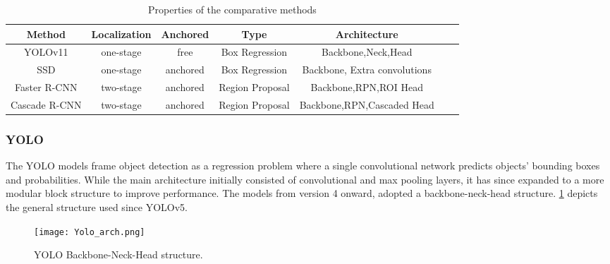 \documentclass{article}
\begin{document}
\begin{table}[!htb]
\begin{center}
\caption{Properties of the comparative methods}
\begin{tabular}{c|cccccc}
\hline
Method&Localization&Anchored&Type&Architecture \\
\hline\hline
YOLOv11&one-stage&free&Box Regression&Backbone,Neck,Head\\
SSD&one-stage&anchored&Box Regression&Backbone, Extra convolutions\\
Faster R-CNN&two-stage&anchored&Region Proposal&Backbone,RPN,ROI Head\\
Cascade R-CNN&two-stage&anchored&Region Proposal&Backbone,RPN,Cascaded Head\\
\hline
\end{tabular}\label{tb:architecture overview}
\end{center}
\end{table}



\subsubsection{YOLO}
\label{sec:YOLO}

The YOLO models frame object detection as a regression problem where a single convolutional network predicts objects' bounding boxes and probabilities. While the main architecture initially consisted of convolutional and max pooling layers, it has since expanded to a more modular block structure to improve performance. The models from version 4 onward, adopted a backbone-neck-head structure. \cref{fig:yoloarch} depicts the general structure used since YOLOv5. 

\begin{figure}[!htb]
\centering
\texttt{[image: Yolo\_arch.png]}
\caption{YOLO Backbone-Neck-Head structure.}
\label{fig:yoloarch}
\end{figure}
\end{document}
